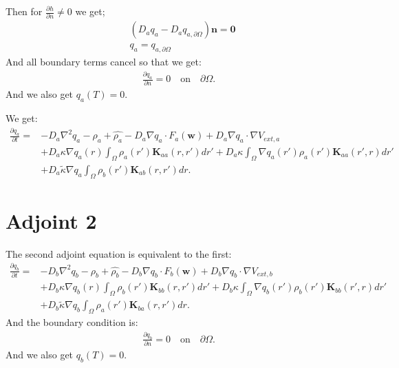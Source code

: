 \documentclass[11pt, a4paper]{article}
\theoremstyle{definition}
\newcommand{\adja}{q_a}
\newcommand{\adjb}{q_b}
\newcommand{\adjaB}{q_{a,\partial \Omega}}
\newcommand{\ra}{\rho_a}
\newcommand{\rb}{\rho_b}
\newcommand{\w}{\mathbf{w}}
\newcommand{\n}{\mathbf{n}}
\newcommand{\K}{\mathbf{K}}
\begin{document}
	Then for $\frac{\partial h}{\partial n} \neq 0$ we get;
	\begin{align*}
	&(D_a \adja - D_a \adjaB) \n = \mathbf 0\\
	&\adja = \adjaB
	\end{align*}
	And all boundary terms cancel so that we get:
	\begin{align*}
	\frac{\partial \adja}{\partial n} = 0 \quad \text{on} \quad \partial \Omega.
	\end{align*}
	And we also get $\adja(T) = 0$.
	
	We get:
	\begin{align*}
	 \frac{\partial \adja}{\partial t} = &- D_a\nabla^2\adja - \ra + \widehat{\ra}    - D_a\nabla \adja \cdot F_a(\w) + D_a \nabla \adja \cdot  \nabla V_{ext,a} \\
	 &+ D_a\kappa \nabla \adja(r) \int_\Omega \ra (r') \K_{aa}(r,r')dr' + D_a\kappa \int_\Omega \nabla \adja(r') \ra (r') \K_{aa}(r',r)dr' \\
	 & + D_a \tilde{\kappa} \nabla \adja \int_\Omega  \rb (r') \K_{ab} (r,r')dr.
	\end{align*}
	\section{Adjoint 2}
	The second adjoint equation is equivalent to the first:
	\begin{align*}
	\frac{\partial \adjb}{\partial t} = &- D_b\nabla^2\adjb - \rb + \widehat{\rb}    - D_b\nabla \adjb \cdot F_b(\w) + D_b \nabla \adjb \cdot  \nabla V_{ext,b} \\
	&+ D_b\kappa \nabla \adjb(r) \int_\Omega \rb (r') \K_{bb}(r,r')dr' + D_b\kappa \int_\Omega \nabla \adjb(r') \rb (r') \K_{bb}(r',r)dr' \\
	& + D_b \tilde{\kappa} \nabla \adjb \int_\Omega  \ra (r') \K_{ba} (r,r')dr.
	\end{align*}
	And the boundary condition is:
	\begin{align*}
	\frac{\partial \adjb}{\partial n} = 0 \quad \text{on} \quad \partial \Omega.
	\end{align*} 
	And we also get $\adjb(T) = 0$.
	
\end{document}
